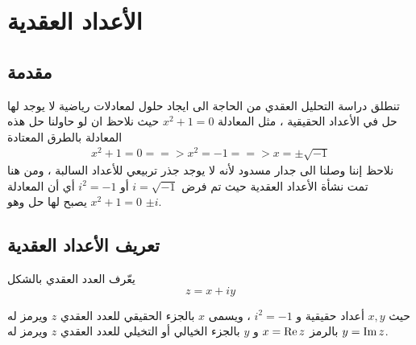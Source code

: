 \chapter{الأعداد العقدية} 


\section{مقدمة}
تنطلق دراسة التحليل العقدي من الحاجة الى  ايجاد حلول لمعادلات رياضية لا يوجد لها حل في الأعداد الحقيقية ، مثل المعادلة \(x^2 + 1 = 0\) حيث نلاحظ ان لو حاولنا حل هذه المعادلة بالطرق المعتادة
\begin{align*}
	x^2 + 1 = 0 ==> x^2 = -1 ==> x = \pm \sqrt{-1}
\end{align*}
نلاحظ إننا وصلنا الى جدار مسدود لأنه لا يوجد جذر تربيعي للأعداد السالبة ، ومن هنا تمت نشأة الأعداد العقدية حيث تم فرض $i = \sqrt{-1}$ أو $i^2=-1 $ أي أن المعادلة $x^2 + 1 = 0 $ يصبح لها حل وهو $\pm i$.

\section{تعريف الأعداد العقدية}
يعّرف العدد العقدي بالشكل 
\[
z = x + iy \tag{*}
\]

حيث \(x, y\) أعداد حقيقية و \(i^2 = -1\) ، ويسمى \(x\) بالجزء الحقيقي للعدد العقدي \(z\) ويرمز له بالرمز \(x = \operatorname{Re} z\) و \(y\) بالجزء الخيالي أو التخيلي للعدد العقدي \(z\) ويرمز له \(y = \operatorname{Im} z\).

